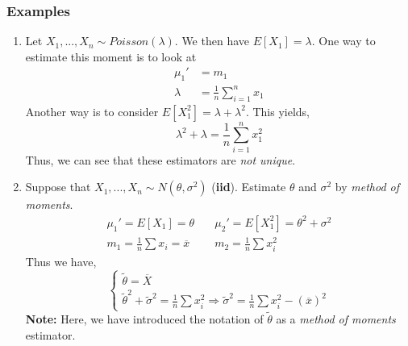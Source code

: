 \documentclass{article}
\begin{document}
\subsubsection{Examples}
\begin{enumerate}
    \item Let $X_1,...,X_n \sim Poisson(\lambda)$. We then have $E[X_1] = \lambda$. One way to estimate this moment is to look at
    \begin{equation*}
        \begin{split}
            \mu_1' &= m_1\\
            \lambda &= \frac{1}{n}\sum_{i=1}^n x_1
        \end{split}
    \end{equation*}
    Another way is to consider $E[X_1^2] = \lambda + \lambda^2$. This yields,
    \begin{equation*}
        \lambda^2 + \lambda = \frac{1}{n}\sum_{i=1}^n x_1^2
    \end{equation*}
    Thus, we can see that these estimators are \textit{not unique}.

    \item Suppose that $X_1,...,X_n\sim N(\theta,\sigma^2)$ (\textbf{iid}). Estimate $\theta$ and $\sigma^2$ by \textit{method of moments}.
    \begin{equation*}
        \begin{split}
            \mu_1' = E[X_1] = \theta &\quad \mu_2' = E[X_1^2] = \theta^2 + \sigma^2\\
            m_1 = \frac{1}{n}\sum x_i = \overline{x} &\quad m_2 = \frac{1}{n} \sum x_i^2
        \end{split}
    \end{equation*}
    Thus we have,
    \begin{equation*}
        \begin{cases}
            \widetilde{\theta} = \overline{X}\\
            \widetilde{\theta}^2 + \widetilde{\sigma}^2 = \frac{1}{n}\sum x_i^2 \Rightarrow \widetilde{\sigma}^2 = \frac{1}{n}\sum x_i^2 - (\overline{x})^2
        \end{cases}
    \end{equation*}
    \textbf{Note:} Here, we have introduced the notation of $\widetilde{\theta}$ as a \textit{method of moments} estimator.


\end{enumerate}
\end{document}
